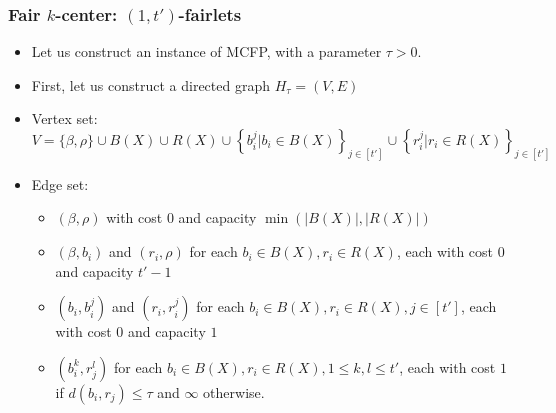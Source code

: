 \documentclass{beamer}
\begin{document}


\begin{frame}
\frametitle{Fair $k$-center: $(1, t')$-fairlets}

\begin{itemize}
	\item Let us construct an instance of MCFP, with a parameter $\tau > 0$. \pause
	
	\item First, let us construct a directed graph $H_\tau = (V, E)$ \pause
	
	\item Vertex set:
$$V = \{\beta, \rho\} \cup B(X) \cup R(X) \cup \left\{ b_i^j | b_i \in B(X) \right\}_{j \in [t']} \cup \left\{ r_i^j | r_i \in R(X) \right\}_{j \in [t']}$$ \pause

	\item Edge set:
	\begin{itemize}
		\item $(\beta, \rho)$ with cost 0 and capacity $\min \left( |B(X)|, |R(X)| \right)$
		\item $(\beta, b_i)$ and $(r_i, \rho)$ for each $b_i \in B(X), r_i \in R(X)$, each with cost $0$ and capacity $t' - 1$
		\item $(b_i, b_i^j)$ and $(r_i, r_i^j)$ for each $b_i \in B(X), r_i \in R(X), j \in [t']$, each with cost $0$ and capacity $1$
		\item $(b_i^k, r_j^l)$ for each $b_i \in B(X), r_i \in R(X), 1 \leq k, l \leq t'$, each with cost $1$ if $d(b_i, r_j) \leq \tau$ and $\infty$ otherwise.
	\end{itemize}
	
\end{itemize}

\end{frame}

\end{document}
